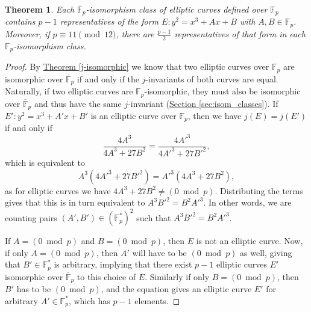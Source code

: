 \documentclass[openany, a4paper, 10pt]{book}
\theoremstyle{plain}
\newtheorem{theorem}{Theorem}[chapter]
\theoremstyle{plain}
\theoremstyle{plain}
\theoremstyle{definition}
\theoremstyle{plain}
\theoremstyle{definition}
\theoremstyle{remark}
\newcommand{\theoref}[1]{\hyperref[#1]{Theorem \ref{#1}}}
\newcommand{\secref}[1]{\hyperref[#1]{Section \ref{#1}}}
\begin{document}
\begin{theorem}\label{representatives}
    Each $\overline{\mathbb F}_p$-isomorphism class of elliptic curves defined over $\mathbb F_p$ contains $p-1$ representatives of the form $E: y^2 = x^3+Ax+B$ with $A, B \in \mathbb F_p$.
    Moreover, if $p \equiv 11 \pmod {12}$, there are $\frac{p-1}{2}$ representatives of that form in each $\mathbb F_p$-isomorphism class.
\end{theorem}
\begin{proof}
    By \theoref{j-isomorphic} we know that two elliptic curves over $\mathbb F_p$ are isomorphic over $\overline {\mathbb F}_p$ if and only if the $j$-invariants of both curves are equal.
    Naturally, if two elliptic curves are $\mathbb F_p$-isomorphic, they must also be isomorphic over $\overline {\mathbb F}_p$ and thus have the same $j$-invariant (\secref{sec:isom_classes}).
    If $E': y^2 = x^3 + A'x + B'$ is an elliptic curve over $\mathbb F_p$, then we have $j(E) = j(E')$ if and only if
    \begin{equation*}
        \frac{4A^3}{4A^3 + 27B^2} = \frac{4A'^3}{4A'^3 + 27B'^2},
    \end{equation*}
    which is equivalent to
    \begin{equation*}
        A^3(4A'^3 + 27B'^2) = A'^3(4A^3 + 27B^2),
    \end{equation*}
    as for elliptic curves we have $4A^3+27B^2 \neq (0 \bmod p)$.
    Distributing the terms gives that this is in turn equivalent to $A^3B'^2 = B^2A'^3$.
    In other words, we are counting pairs $(A', B') \in (\mathbb F_p^*)^2$ such that $A^3 B'^2 = B^2 A'^3$.

    If $A=(0 \bmod p)$ and $B=(0 \bmod p)$, then $E$ is not an elliptic curve.
    Now, if only $A=(0\bmod p)$, then $A'$ will have to be $(0 \bmod p)$ as well, giving that $B' \in \mathbb F_p^*$ is arbitrary, implying that there exist $p-1$ elliptic curves $E'$ isomorphic over $\overline {\mathbb F}_p$ to this choice of $E$.
    Similarly if only $B=(0 \bmod p)$, then $B'$ has to be $(0 \bmod p)$, and the equation gives an elliptic curve $E'$ for arbitrary $A' \in \mathbb F_p^*$, which has $p-1$ elements.


\end{proof}
\end{document}
